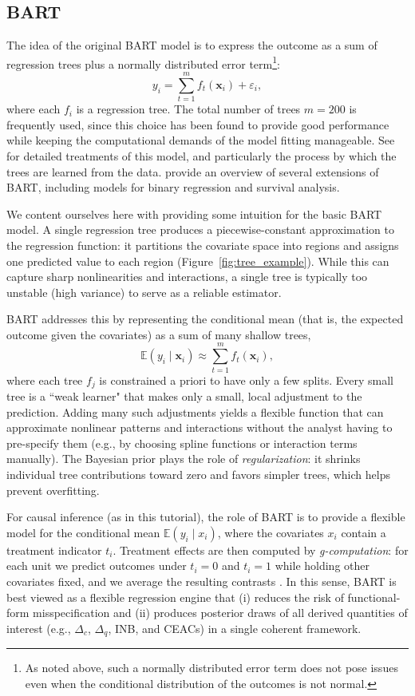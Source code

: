 \documentclass[aoas,preprint]{imsart}
\theoremstyle{plain}
\theoremstyle{definition}
\theoremstyle{remark}
\theoremstyle{remark}
\begin{document}
\subsection{BART}

The idea of the original BART model is to express the outcome as a sum of regression trees plus a normally distributed error term\footnote{As noted above, such a normally distributed error term does not pose issues even when the conditional distribution of the outcomes is not normal.}: 
\[y_i = \sum^m_{t=1} f_t\left(\mathbf{x}_i\right) + \varepsilon_i,\]
where each $f_i$ is a regression tree.
The total number of trees $m=200$ is frequently used, since this choice has been found to provide good performance while keeping the computational demands of the model fitting manageable. 
See \citet{chipman2010bart,tan2019bayesian} for detailed treatments of this model, and particularly the process by which the trees are learned from the data. \citet{hill2020bayesian} provide an overview of several extensions of BART, including models for binary regression and survival analysis.

We content ourselves here with providing some intuition for the basic BART model. A single regression tree produces a piecewise-constant approximation to the regression function: it partitions the covariate space into regions and assigns one predicted value to each region (Figure~\ref{fig:tree_example}). While this can capture sharp nonlinearities and interactions, a single tree is typically too unstable (high variance) to serve as a reliable estimator.

BART addresses this by representing the conditional mean (that is, the expected outcome given the covariates) as a sum of many shallow trees,
\[
\mathbb{E}(y_i\mid \mathbf{x}_i)\approx \sum_{t=1}^{m} f_t(\mathbf{x}_i),
\]
where each tree $f_j$ is constrained a priori to have only a few splits. Every small tree is a “weak learner" that makes only a small, local adjustment to the prediction. Adding many such adjustments yields a flexible function that can approximate nonlinear patterns and interactions without the analyst having to pre-specify them (e.g., by choosing spline functions or interaction terms manually). The Bayesian prior plays the role of \emph{regularization}: it shrinks individual tree contributions toward zero and favors simpler trees, which helps prevent overfitting.

For causal inference (as in this tutorial), the role of BART is to provide a flexible model for the conditional mean $\mathbb{E}(y_i\mid x_i)$, where the covariates $x_i$ contain a treatment indicator $t_i$. Treatment effects are then computed by \emph{g-computation}: for each unit we predict outcomes under $t_i=0$ and $t_i=1$ while holding other covariates fixed, and we average the resulting contrasts \citep{hernan2024causal}. In this sense, BART is best viewed as a flexible regression engine that (i) reduces the risk of functional-form misspecification and (ii) produces posterior draws of all derived quantities of interest (e.g., $\Delta_c$, $\Delta_q$, INB, and CEACs) in a single coherent framework.
\end{document}
